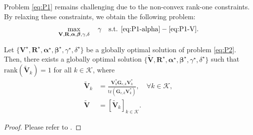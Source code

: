 \documentclass[runningheads]{llncs}
\begin{document}
%
Problem \eqref{eq:P1} remains challenging due to the non-convex rank-one constraints. By relaxing these constraints, we obtain the following problem:
\begin{align}
\label{eq:P2}
\max_{\mathbf{V}, \mathbf{R}, \boldsymbol{\alpha}, \boldsymbol{\beta}, \gamma, \delta} \quad \gamma 
\quad \text{s.t. } \eqref{eq:P1-alpha}-\eqref{eq:P1-V}.
\end{align}

\begin{theorem}
Let $\{\mathbf{V}^\star, \mathbf{R}^\star, \boldsymbol{\alpha}^\star, \boldsymbol{\beta}^\star, \gamma^\star, \delta^\star\}$ be a globally optimal solution of problem \eqref{eq:P2}. Then, there exists a globally optimal solution $\{\tilde{\mathbf{V}}, \mathbf{R}^\star, \boldsymbol{\alpha}^\star, \boldsymbol{\beta}^\star, \gamma^\star, \delta^\star\}$ such that $\mathrm{rank}(\tilde{\mathbf{V}}_k) = 1$ for all $k \in \mathcal{K}$, where
\begin{align}
 \tilde{\mathbf{V}}_k &= \frac{\mathbf{V}_k^* \mathbf{G}_{c,k} \mathbf{V}_k^*}
{\mathrm{tr} (\mathbf{G}_{c,k} \mathbf{V}_k^*)}, \quad \forall k \in \mathcal{K},  \\
 \tilde{\mathbf{V}} &= [\tilde{\mathbf{V}}_k ]_{  k \in \mathcal{K}}.
\end{align}
\end{theorem}

\begin{proof}
Please refer to \cite{liu2020joint, ren2022optimal}.
\end{proof}
\end{document}
